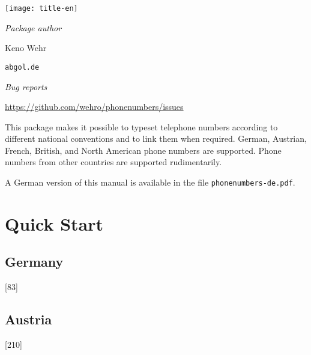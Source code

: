 \documentclass[numbers=noenddot]{scrreprt}
\newcommand\EMailDomain{abgol}
\newcommand\EMailTopLevelDomain{de}
\begin{document}
\begin{titlepage}
\begin{center}
\texttt{[image: title-en]}

\vfill
\large
\textit{Package author}

\smallskip
Keno Wehr

\normalsize
\texttt{\EMail@\EMailDomain.\EMailTopLevelDomain}

\bigskip
\large
\textit{Bug reports}

\smallskip
\normalsize
\url{https://github.com/wehro/phonenumbers/issues}
\end{center}

\bigskip
\noindent This package makes it possible to typeset telephone numbers according to different national conventions and to link them when required. German, Austrian, French, British, and North American phone numbers are supported. Phone numbers from other countries are supported rudimentarily.

\bigskip
\noindent A German version of this manual is available in the file \texttt{phonenumbers-de.pdf}.
\end{titlepage}

\tableofcontents


\chapter{Quick Start}
\section{Germany}
\begin{sidebyside}
  [83]
\end{sidebyside}
\begin{sidebyside}
\end{sidebyside}
\begin{sidebyside}
\end{sidebyside}
\begin{sidebyside}
\end{sidebyside}

\section{Austria}
\begin{sidebyside}
  [210]
\end{sidebyside}
\end{document}
